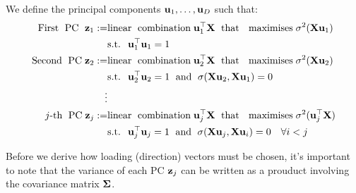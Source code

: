 \documentclass[a4paper]{article}
\begin{document}
\begin{definition}
We define the principal components $\textbf{u}_1,\ldots,\textbf{u}_D$ such that:
\begin{align*}
    \textup{First\; PC\; } \textbf{z}_1 := &\textup{linear\; combination\;} \textbf{u}_1^{\top}\textbf{X} \textup{\; that \; maximises\;}\sigma^2(\textbf{X}\textbf{u}_1)\\
    &\textup{s.t. \;} \textbf{u}_1^{\top}\textbf{u}_1 = 1\\
    \textup{Second\; PC\;} \textbf{z}_2 := &\textup{linear\; combination\;} \textbf{u}_2^{\top}\textbf{X} \textup{\; that \; maximises\;}\sigma^2(\textbf{X}\textbf{u}_2)\\
    &\textup{s.t. \;} \textbf{u}_2^{\top}\textbf{u}_2 = 1 \textup{\; and \;} \sigma(\textbf{X}\textbf{u}_2, \textbf{X}\textbf{u}_1) = 0\\
    \vdots \\
    j\textup{-th\; PC\;} \textbf{z}_j := &\textup{linear\; combination\;} \textbf{u}_j^{\top}\textbf{X} \textup{\; that \; maximises\;}\sigma^2(\textbf{u}_j^{\top}\textbf{X})\\
    &\textup{s.t. \;} \textbf{u}_j^{\top}\textbf{u}_j = 1 \textup{\; and \;} \sigma(\textbf{X}\textbf{u}_j, \textbf{X}\textbf{u}_i) = 0 \quad \forall i < j\\
\end{align*}
\end{definition}
Before we derive how loading (direction) vectors must be chosen, it's important to note that the variance of each PC $\textbf{z}_j$ can be written as a prouduct involving the covariance matrix $\boldsymbol{\Sigma}$.
\end{document}
